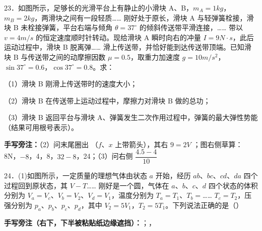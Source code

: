\begin{problem}[粘贴印刷题 23]
23．如图所示，足够长的光滑平台上有静止的小滑块 A、B，$m_A=1\unit{kg}$，$m_B=2\unit{kg}$，两滑块之间有一段轻质……%
刚好处于原长，滑块 A 与轻弹簧栓接，滑块 B 未栓接弹簧，平台右端与倾角 $\theta=37^\circ$ 的倾斜传送带平滑连接，……%
带以 $v=4\unit{m/s}$ 的恒定速度顺时针转动。现给滑块 A 瞬时向右的冲量 $I=9\unit{N\cdot s}$，此后运动过程中，滑块 B 脱离弹……%
滑上传送带，并恰好能到达传送带顶端。已知滑块 B 与传送带之间的动摩擦因数 $\mu=0.5$，取重力加速度 $g=10\unit{m/s^2}$，$\sin37^\circ=0.6$，$\cos37^\circ=0.8$。求：

（1）滑块 B 刚滑上传送带时的速度大小；

（2）滑块 B 在传送带上运动过程中，摩擦力对滑块 B 做的总功；

（3）滑块 B 返回平台与滑块 A、弹簧发生二次作用过程中，弹簧的最大弹性势能（结果可用根号表示）。


\medskip
\noindent\textbf{手写旁注：}（2）问末尾圈出 （$f$、$x$ 上带箭头），其右 $9=2V$%
；图右侧草算：8N，$-8$，4，8，$32-8$，24；（3）问右侧 $\dfrac{4.5-4}{10}$
\end{problem}
\begin{problem}[粘贴印刷题 24(1)]
24．(1)如图所示，一定质量的理想气体由状态 $a$ 开始，经历 $ab$、$bc$、$cd$、$da$ 四个过程回到原状态，其 $V-T$……%
刚好是一个圆，气体在 $a$、$b$、$c$、$d$ 四个状态的体积分别为 $V_a=V_c$、$V_b=V_2$、$V_d=V_1$，温度分别为 $T_a=T_1$、$T_b=$……%
$T_c=T_2$，压强分别为 $p_a$、$p_b$、$p_c$、$p_d$，其中 $V_2=5V_1$，$T_2=5T_1$。下列说法正确的是（\qquad）

\medskip
\noindent\textbf{手写旁注（右下，下半被粘贴纸边缘遮挡）：}；，%
\end{problem}
